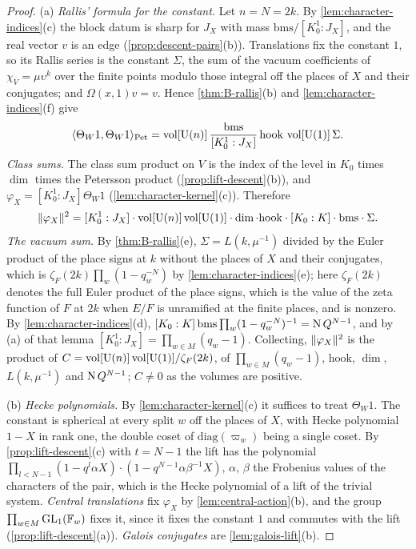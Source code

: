 \begin{proof}
(a) \emph{Rallis' formula for the constant.} Let $n=N=2k$. By \cref{lem:character-indices}(c) the block datum is sharp for $J_X$ with mass $\mathrm{bms}/[K_0^1:J_X]$, and the real vector $v$ is an edge (\cref{prop:descent-pairs}(b)). Translations fix the
constant $1$, so its Rallis series is the constant $\Sigma$, the sum of the vacuum coefficients of $\chi_V=\mu\upsilon^k$ over the finite points modulo those integral off the places of $X$ and their conjugates; and $\Omega(x,1)v=v$. Hence
\cref{thm:B-rallis}(b) and \cref{lem:character-indices}(f) give
\[
  \langle\Theta_W1,\Theta_W1\rangle_{\rm Pet}=\operatorname{vol}[\operatorname{U}(n)]\,\frac{\mathrm{bms}}{[K_0^1:J_X]}\,\mathrm{hook}\,\operatorname{vol}[\operatorname{U}(1)]\,\Sigma.
\]
\emph{Class sums.} The class sum product on $V$ is the index of the level in $K_0$ times $\dim$ times the Petersson product (\cref{prop:lift-descent}(b)), and $\varphi_X=[K_0^1:J_X]\Theta_W1$ (\cref{lem:character-kernel}(c)). Therefore
\[
  \lVert \varphi_X\rVert^2=[K_0^1:J_X]\cdot\operatorname{vol}[\operatorname{U}(n)]\operatorname{vol}[\operatorname{U}(1)]\cdot\dim\cdot\mathrm{hook}\cdot[K_0:K]\cdot\mathrm{bms}\cdot\Sigma.
\]
\emph{The vacuum sum.} By \cref{thm:B-rallis}(e), $\Sigma=L(k,\mu^{-1})$ divided by the Euler product of the place signs at $k$ without the places of $X$ and their conjugates, which is $\zeta_F(2k)\prod_w(1-q_w^{-N})$ by
\cref{lem:character-indices}(e); here $\zeta_F(2k)$ denotes the full Euler product of the place signs, which is the value of the zeta function of $F$ at $2k$ when $E/F$ is unramified at the finite places, and is nonzero.
By \cref{lem:character-indices}(d), $[K_0:K]\,\mathrm{bms}\prod_w(1-q_w^{-N})^{-1}=\operatorname{N} Q^{N-1}$, and by (a) of that lemma $[K_0^1:J_X]=\prod_{w\in M}(q_w-1)$. Collecting, $\lVert \varphi_X\rVert^2$ is the product of $C=\operatorname{vol}[\operatorname{U}(n)]\operatorname{vol}[\operatorname{U}(1)]/\zeta_F(2k)$, of
$\prod_{w\in M}(q_w-1)$, $\mathrm{hook}$, $\dim$, $L(k,\mu^{-1})$ and $\operatorname{N} Q^{N-1}$; $C\ne0$ as the volumes are positive.

(b) \emph{Hecke polynomials.} By \cref{lem:character-kernel}(c) it suffices to treat $\Theta_W1$. The constant is spherical at every split $w$ off the places of $X$, with Hecke polynomial $1-X$ in rank one, the double coset of
$\mathrm{diag}(\varpi_w)$ being a single coset. By \cref{prop:lift-descent}(c) with $t=N-1$ the lift has the polynomial $\prod_{l<N-1}(1-q^l\alpha X)\cdot(1-q^{N-1}\alpha\beta^{-1}X)$, $\alpha$, $\beta$ the Frobenius values of the characters of the pair, which is the
Hecke polynomial of a lift of the trivial system. \emph{Central translations} fix $\varphi_X$ by \cref{lem:central-action}(b), and the group $\prod_{w\in M}\operatorname{GL}_1(\mathbb{F}_w)$ fixes it, since it fixes the constant $1$ and commutes with the
lift (\cref{prop:lift-descent}(a)). \emph{Galois conjugates} are \cref{lem:galois-lift}(b).


\end{proof}
